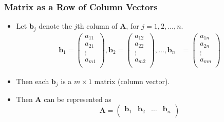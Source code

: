 \documentclass[../ma2001_notes.tex]{subfiles}
\begin{document}
\subsubsection{Matrix as a Row of Column Vectors}
\begin{itemize}
	\item Let \(\bm{b}_j\) denote the \(j\)th column of \(\bm{A}\), for \(j=1,2,\ldots,n\).
	\begin{align*}
		\bm{b}_1 = \left(\begin{array}{c}
			a_{11} \\
			a_{21} \\
			\vdots \\
			a_{m1} \\
		\end{array}\right),
		\bm{b}_2 = \left(\begin{array}{c}
			a_{12} \\
			a_{22} \\
			\vdots \\
			a_{m2} \\
		\end{array}\right),
		\ldots,
		\bm{b}_n &= \left(\begin{array}{c}
			a_{1n} \\
			a_{2n} \\
			\vdots \\
			a_{mn} \\
		\end{array}\right)
	\end{align*}
	\item Then each \(\bm{b}_j\) is a \(m\times1\) matrix (column vector).
	\item Then \(\bm{A}\) can be represented as
	\[\bm{A}=\left(\begin{array}{cccc}
		\bm{b}_1 & \bm{b}_2 & \ldots & \bm{b}_n \\
	\end{array}\right)\]
\end{itemize}
\end{document}
